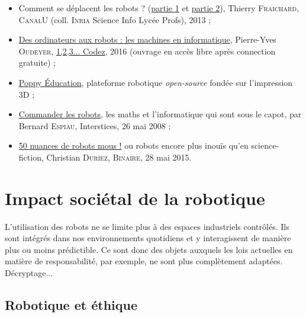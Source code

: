 \begin{gofurther}
\begin{itemize}\jazzitem
\item Comment se déplacent les robots ? (\href{https://www.canal-u.tv/video/inria/comment_se_deplacent_les_robots_1ere_partie.12697}{partie 1} et \href{https://www.canal-u.tv/video/inria/comment_se_deplacent_les_robots_2eme_partie.12698}{partie 2}), Thierry \textsc{Fraichard},  \textsc{CanalU} (coll. \textsc{Inria} Science Info Lycée Profs), 2013 ;
\item \href{http://www.pyoudeyer.com/oudeyerMachinesRobots123Codez.pdf}{Des ordinateurs aux robots : les machines en informatique}, Pierre-Yves \textsc{Oudeyer}, \href{https://www.fondation-lamap.org/fr/123codez}{1,2,3... Codez}, 2016 (ouvrage en accès libre après connection gratuite) ;
\item \href{https://www.poppy-project.org/fr/education/}{Poppy Éducation}, plateforme robotique \textit{open-source} fondée sur l’impression 3D  ;
\item \href{https://interstices.info/commander-les-robots/}{Commander les robots}, les maths et l'informatique qui sont sous le capot, par Bernard \textsc{Espiau}, Interstices, 26 mai 2008  ;
\item \href{https://www.lemonde.fr/blog/binaire/2015/05/28/50-nuances-de-robots-mous/}{50 nuances de robots mous !} ou robots encore plus inouïs qu'en science-fiction, Christian \textsc{Duriez}, \textsc{Binaire}, 28 mai 2015.
\end{itemize}
\end{gofurther}



\section[Impact sociétal de la robotique]{Impact sociétal de la robotique}
\label{sec:III.3}

L'utilisation des robots ne se limite plus à des espaces industriels contrôlés. Ils sont intégrés dans nos environnements quotidiens et y interagissent de manière plus ou moins prédictible. Ce sont donc des objets auxquels les lois actuelles en matière de responsabilité, par exemple, ne sont plus complètement adaptées. Décryptage...


\subsection[Robotique et éthique]{Robotique et éthique}
\label{sub:III.3.1}

